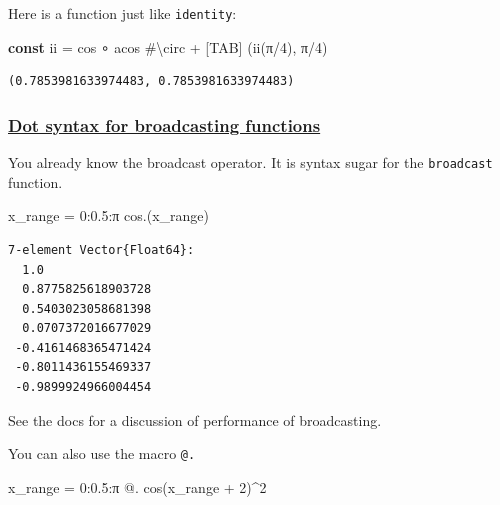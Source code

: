 \documentclass[
]{article}
\newenvironment{Shaded}{\begin{snugshade}}{\end{snugshade}}
\newcommand{\CommentTok}[1]{\textcolor[rgb]{0.37,0.37,0.37}{#1}}
\newcommand{\ConstantTok}[1]{\textcolor[rgb]{0.56,0.35,0.01}{#1}}
\newcommand{\FloatTok}[1]{\textcolor[rgb]{0.68,0.00,0.00}{#1}}
\newcommand{\FunctionTok}[1]{\textcolor[rgb]{0.28,0.35,0.67}{#1}}
\newcommand{\KeywordTok}[1]{\textcolor[rgb]{0.00,0.23,0.31}{\textbf{#1}}}
\newcommand{\NormalTok}[1]{\textcolor[rgb]{0.00,0.23,0.31}{#1}}
\newcommand{\OperatorTok}[1]{\textcolor[rgb]{0.37,0.37,0.37}{#1}}
\begin{document}
Here is a function just like \texttt{identity}:

\begin{Shaded}
\begin{Highlighting}[]
\KeywordTok{const}\NormalTok{ ii }\OperatorTok{=}\NormalTok{ cos }\OperatorTok{∘}\NormalTok{ acos }\CommentTok{\#\textbackslash{}circ + [TAB]}
\NormalTok{(}\FunctionTok{ii}\NormalTok{(}\ConstantTok{π}\OperatorTok{/}\FloatTok{4}\NormalTok{), }\ConstantTok{π}\OperatorTok{/}\FloatTok{4}\NormalTok{)}
\end{Highlighting}
\end{Shaded}

\begin{verbatim}
(0.7853981633974483, 0.7853981633974483)
\end{verbatim}

\subsubsection{\texorpdfstring{\href{https://docs.julialang.org/en/v1/manual/functions/\#man-vectorized}{Dot
syntax for broadcasting
functions}}{Dot syntax for broadcasting functions}}\label{dot-syntax-for-broadcasting-functions}

You already know the broadcast operator. It is syntax sugar for the
\texttt{broadcast} function.

\begin{Shaded}
\begin{Highlighting}[]
\NormalTok{x\_range }\OperatorTok{=} \FloatTok{0}\OperatorTok{:}\FloatTok{0.5}\OperatorTok{:}\ConstantTok{π}
\FunctionTok{cos}\NormalTok{.(x\_range)}
\end{Highlighting}
\end{Shaded}

\begin{verbatim}
7-element Vector{Float64}:
  1.0
  0.8775825618903728
  0.5403023058681398
  0.0707372016677029
 -0.4161468365471424
 -0.8011436155469337
 -0.9899924966004454
\end{verbatim}

See the docs for a discussion of performance of broadcasting.

You can also use the macro \texttt{@.}

\begin{Shaded}
\begin{Highlighting}[]
\NormalTok{x\_range }\OperatorTok{=} \FloatTok{0}\OperatorTok{:}\FloatTok{0.5}\OperatorTok{:}\ConstantTok{π}
\NormalTok{@. }\FunctionTok{cos}\NormalTok{(x\_range }\OperatorTok{+} \FloatTok{2}\NormalTok{)}\OperatorTok{\^{}}\FloatTok{2}
\end{Highlighting}
\end{Shaded}
\end{document}
